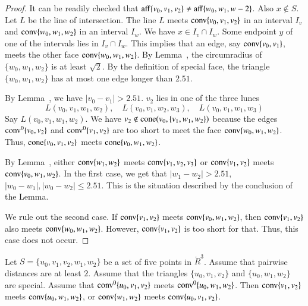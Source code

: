 \begin{proof}
It can be readily checked that ${\operatorname{aff}}\{v_0,v_1,v_2\}\ne
{\operatorname{aff}}\{w_0,w_1,w-2\}$.  Also $x\not\in S$.
Let $L$ be the line of intersection.
The line $L$ meets ${\operatorname{conv}}\{v_0,v_1,v_2\}$ in an interval $I_v$
and ${\operatorname{conv}}\{w_0,w_1,w_2\}$ in an interval $I_w$.  We have
$x\in I_v\cap I_w$.  Some endpoint $y$ of one of the intervals lies
in $I_v\cap I_w$.  This implies that an edge, say ${\operatorname{conv}}\{v_0,v_1\}$,
meets the other face ${\operatorname{conv}}\{w_0,w_1,w_2\}$.  
By Lemma~,
the circumradius of $\{w_0,w_1,w_2\}$ is at least $\sqrt2$.  By
the definition of special face, the triangle $\{w_0,w_1,w_2\}$
has at most one edge longer than $2.51$.

By Lemma~, we have $|v_0-v_1|>2.51$.  
$v_2$ lies in one of the three lunes
$$L(v_0,v_1,w_1,w_2),\quad L(v_0,v_1,w_2,w_3),\quad L(v_0,v_1,w_1,w_3)$$
Say $L(v_0,v_1,w_1,w_2)$.   We have $v_2\not\in{\operatorname{cone}}(v_0,\{v_1,w_1,w_2\})$
because the edges ${\operatorname{conv}}^0\{v_0,v_2\}$ 
and ${\operatorname{conv}}^0\{v_1,v_2\}$ are too short to meet
the face ${\operatorname{conv}}\{w_0,w_1,w_2\}$.  Thus, ${\operatorname{cone}}\{v_0,v_1,v_2\}$ meets
${\operatorname{cone}}\{v_0,w_1,w_2\}$.

By Lemma~,
either ${\operatorname{conv}}\{w_1,w_2\}$ meets ${\operatorname{conv}}\{v_1,v_2,v_3\}$ or
${\operatorname{conv}}\{v_1,v_2\}$ meets ${\operatorname{conv}}\{v_0,w_1,w_2\}$.
In the first case, we get that $|w_1-w_2|>2.51$, $|w_0-w_1|,|w_0-w_2|\le 2.51$.
This is the situation described by the conclusion of the Lemma.

We rule out the second case.  If 
${\operatorname{conv}}\{v_1,v_2\}$ meets ${\operatorname{conv}}\{v_0,w_1,w_2\}$,
then ${\operatorname{conv}}\{v_1,v_2\}$ also meets ${\operatorname{conv}}\{w_0,w_1,w_2\}$.
However, ${\operatorname{conv}}\{v_1,v_2\}$ is too short for that.  Thus,
this case does not occur.
\end{proof}

\newpage

\begin{lemma}
Let $S=\{u_0,v_1,v_2,w_1,w_2\}$ be a set of five points in $\ring{R}^3$.
Assume that pairwise distances are at least $2$.
Assume that the triangles $\{u_0,v_1,v_2\}$ and $\{u_0,w_1,w_2\}$ are
special.
Assume that ${\operatorname{conv}}^0\{u_0,v_1,v_2\}$ meets
${\operatorname{conv}}^0\{u_0,w_1,w_2\}$.  Then
${\operatorname{conv}}\{v_1,v_2\}$ meets ${\operatorname{conv}}\{u_0,w_1,w_2\}$, or
${\operatorname{conv}}\{w_1,w_2\}$ meets ${\operatorname{conv}}\{u_0,v_1,v_2\}$.
\end{lemma}

